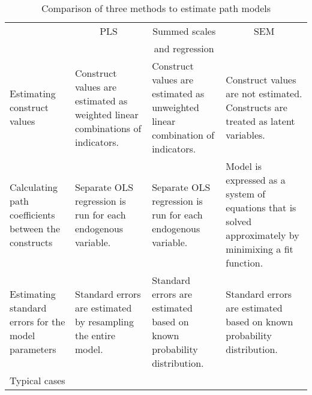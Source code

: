 \documentclass[10pt]{report}
\begin{document}
\begin{table}[ht]
\begin{center}
\caption{Comparison of three methods to estimate path models}
\begin{tabular}{p{}p{}p{}p{}}
\toprule
&\multicolumn{1}{c}{PLS}&\multicolumn{1}{c}{Summed scales}&\multicolumn{1}{c}{SEM}\\
&&\multicolumn{1}{c}{and regression}\\
\midrule
Estimating construct values&Construct values are estimated as weighted linear combinations of indicators.&Construct values are estimated as unweighted linear combination of indicators.&Construct values are not estimated. Constructs are treated as latent variables. \\ \noalign{\smallskip}
Calculating path coefficients between the constructs&Separate OLS regression is run for each endogenous variable.&Separate OLS regression is run for each endogenous variable.& Model is expressed as a system of equations that is solved approximately by minimixing a fit function. \\ \noalign{\smallskip}
Estimating standard errors for the model parameters&Standard errors are estimated by resampling the entire model.&Standard errors are estimated based on known probability distribution.&Standard errors are estimated based on known probability distribution. \\ 
\bottomrule
\footnotesize{Typical cases}\\
\end{tabular}
\end{center}
\end{table}


\end{document}
